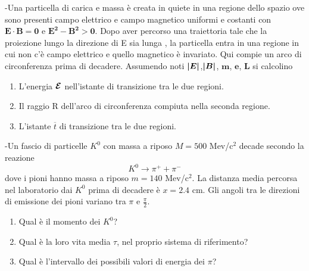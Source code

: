\documentclass[12pt,twoside,a4]{article}
\begin{document}
\begin{esercizio}[Esame 26-06-2007]
	-Una particella di carica  e  massa  è creata in quiete in una regione dello spazio ove sono presenti campo elettrico  e campo magnetico  uniformi e costanti con $\boldsymbol{E \cdot B = 0}$ e $\boldsymbol{E^2 - B^2 > 0}$. Dopo aver percorso una traiettoria tale che la proiezione lungo la direzione di E sia lunga , la particella entra in una regione in cui non c'è campo elettrico e quello magnetico è invariato. Qui compie un arco di circonferenza prima di decadere. Assumendo noti $\boldsymbol{\left| {E} \right|}$,$\boldsymbol{\left| {B} \right|}$, $\boldsymbol{m}$, $\boldsymbol{e}$, $\boldsymbol{L}$ si calcolino
\begin{enumerate}[label=(\textit{\roman*})]
\item L'energia $\boldsymbol{\mathcal{E}}$ nell'istante di transizione tra le due regioni.
\item Il raggio R dell'arco di circonferenza compiuta nella seconda regione.
\item L'istante $\overline{t}$ di transizione tra le due regioni.
\end{enumerate}
\end{esercizio}

\begin{esercizio}[Esame 10-07-2007]
	-Un fascio di particelle $K^0$ con massa a riposo $M = 500$ Mev/c$^2$ decade secondo la reazione
$$ K^0 \longrightarrow \pi^+ + \pi^-$$
dove i pioni hanno massa a riposo $m = 140$ Mev/c$^2$. La distanza media percorsa nel laboratorio dai $K^0$ prima di decadere è $x = 2.4$ cm. Gli angoli tra le direzioni di emissione dei pioni variano tra $\pi$ e $\frac{\pi}{2}$.
\begin{enumerate}[label=(\textit{\roman*})]
\item Qual è il momento dei $K^0$?
\item Qual è la loro vita media $\tau$, nel proprio sistema di riferimento?
\item Qual è l'intervallo dei possibili valori di energia dei $\pi$?
\end{enumerate}
\end{esercizio}
\end{document}
